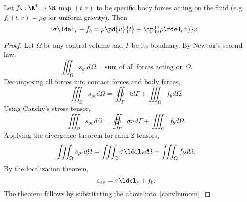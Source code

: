 \begin{thm}
    Let $f_b:\R^4\to \R$ map $(t,r)$ to be specific body forces acting on the fluid
    (e.g. $f_b(t,r)=\rho g$ for uniform gravity).
    Then
    \begin{equation}
        \label{cauchymom}
        \sigma \ldel_r + f_b = \rho \pd{v}{t} + \tp{( \rho \rdel_r v )} v.
    \end{equation}
\end{thm}

\begin{proof}
    Let $\Omega$ be any control volume and $\Gamma$ be its boudnary.  By Newton's second law,
    \begin{equation}
        \iiint_\Omega s_{\rho v} d\Omega = \text{sum of all forces acting on $\Omega$}.
    \end{equation}
    Decomposing all forces into contact forces and body forces,
    \begin{equation}
        \iiint_\Omega s_{\rho v} d\Omega = \oiint_\Gamma \mathfrak{t} d\Gamma + \iiint_\Omega f_b d\Omega.
    \end{equation}
    Using Cauchy's stress tensor,
    \begin{equation}
        \iiint_\Omega s_{\rho v} d\Omega = \oiint_\Gamma \sigma n d\Gamma + \iiint_\Omega f_b d\Omega.
    \end{equation}
    Applying the divergence theorem for rank-2 tensors,
    \begin{equation}
        \iiint_\Omega s_{\rho v} d\Omega = \iiint_\Omega \sigma \ldel_r d\Omega + \iiint_\Omega f_b d\Omega.
    \end{equation}
    By the localization theorem, 
    \begin{equation}
        s_{\rho v} = \sigma \ldel_r + f_b.
    \end{equation}
The theorem follows by substituting the above into~\autoref{convlinmom}.
\end{proof}

%

